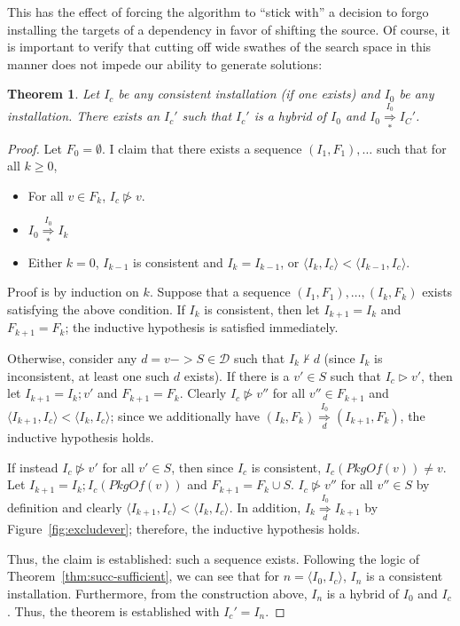 \documentclass[letterpaper]{article}
\newtheorem{theorem}{Theorem}
\theoremstyle{definition}
\theoremstyle{remark}
\newcommand{\D}{\mathcal{D}}
\newcommand{\pkgof}[1]{PkgOf(#1)}
\newcommand{\idist}[2]{\langle#1,#2\rangle}
\newcommand{\nsol}[2]{\overset{#1}{\underset{#2}{\Rightarrow}}}
\newcommand{\nsolmany}[1]{\overset{#1}{\underset{*}{\Rightarrow}}}
\newcommand{\installs}{\vartriangleright}
\newcommand{\satisfies}{\vdash}
\begin{document}
This has the effect of forcing the algorithm to ``stick with'' a
decision to forgo installing the targets of a dependency in favor of
shifting the source.  Of course, it is important to verify that
cutting off wide swathes of the search space in this manner does not
impede our ability to generate solutions:

\begin{theorem}
  Let $I_c$ be any consistent installation (if one exists) and $I_0$
  be any installation.  There exists an $I_c'$ such that $I_c'$ is a
  hybrid of $I_0$ and $I_0 \nsolmany{I_0} I_C'$.
\end{theorem}

\begin{proof}
  Let $F_0=\emptyset$.  I claim that there exists a sequence
  $(I_1,F_1),\dots$ such that for all $k \geq 0$,

  \begin{itemize}
  \item For all $v \in F_k$, $I_c \not \installs v$.
  \item $I_0 \nsolmany{I_0} I_k$
  \item Either $k=0$, $I_{k-1}$ is consistent and $I_k=I_{k-1}$, or
    $\idist{I_k}{I_c}<\idist{I_{k-1}}{I_c}$.
  \end{itemize}

  Proof is by induction on $k$.  Suppose that a sequence
  $(I_1,F_1),\dots,(I_k,F_k)$ exists satisfying the above condition.
  If $I_k$ is consistent, then let $I_{k+1}=I_k$ and $F_{k+1}=F_k$;
  the inductive hypothesis is satisfied immediately.

  Otherwise, consider any $d=v -> S \in \D$ such that $I_k \not
  \satisfies d$ (since $I_k$ is inconsistent, at least one such $d$
  exists).  If there is a $v' \in S$ such that $I_c \installs v'$,
  then let $I_{k+1}=I_k;v'$ and $F_{k+1}=F_k$.  Clearly $I_c \not
  \installs v''$ for all $v'' \in F_{k+1}$ and
  $\idist{I_{k+1}}{I_c}<\idist{I_k}{I_c}$; since we additionally have
  $(I_k,F_k) \nsol{I_0}{d} (I_{k+1},F_k)$, the inductive hypothesis
  holds.

  If instead $I_c \not \installs v'$ for all $v' \in S$, then since
  $I_c$ is consistent, $I_c(\pkgof{v}) \neq v$.  Let
  $I_{k+1}=I_k;I_c(\pkgof{v})$ and $F_{k+1}=F_k \cup S$. $I_c \not
  \installs v''$ for all $v'' \in S$ by definition and clearly
  $\idist{I_{k+1}}{I_c}<\idist{I_k}{I_c}$.  In addition, $I_k
  \nsol{I_0}{d} I_{k+1}$ by Figure~\ref{fig:excludever}; therefore,
  the inductive hypothesis holds.

  Thus, the claim is established: such a sequence exists.  Following
  the logic of Theorem~\ref{thm:succ-sufficient}, we can see that for
  $n=\idist{I_0}{I_c}$, $I_n$ is a consistent installation.
  Furthermore, from the construction above, $I_n$ is a hybrid of $I_0$
  and $I_c$.  Thus, the theorem is established with $I_c'=I_n$.
\end{proof}
\end{document}
